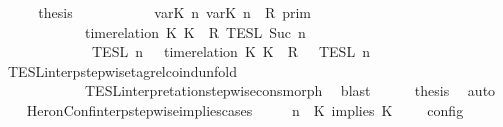 \begin{isabellebody}
\ \ \isamarkupfalse%
\ \isamarkupfalse%
\ {\isacharquery}thesis\isanewline
\ \ \isamarkupfalse%
\ {\isacharminus}\isanewline
\ \ \ \ \isamarkupfalse%
\ {\isacartoucheopen}{\isasymlbrakk}\ {\isasymlfloor}{\isasymtau}\isactrlsub v\isactrlsub a\isactrlsub r{\isacharparenleft}K\ n{\isacharparenright}{\isacharcomma}\ {\isasymtau}\isactrlsub v\isactrlsub a\isactrlsub r{\isacharparenleft}K\ n{\isacharparenright}{\isasymrfloor}\ {\isasymin}\ R\ {\isasymrbrakk}\isactrlsub p\isactrlsub r\isactrlsub i\isactrlsub m\isanewline
\ \ \ \ \ \ \ \ \ \ {\isasyminter}\ {\isasymlbrakk}\ time{\isacharminus}relation\ {\isasymlfloor}K\ K\ {\isasymin}\ R\ {\isasymrbrakk}\isactrlsub T\isactrlsub E\isactrlsub S\isactrlsub L\isactrlbsup {\isasymge}\ Suc\ n\isactrlesup \isanewline
\ \ \ \ \ \ \ \ \ \ {\isasyminter}\ {\isasymlbrakk}{\isasymlbrakk}\ {\isasymPsi}\ {\isasymrbrakk}{\isasymrbrakk}\isactrlsub T\isactrlsub E\isactrlsub S\isactrlsub L\isactrlbsup {\isasymge}\ n\isactrlesup \ {\isacharequal}\ {\isasymlbrakk}{\isasymlbrakk}\ {\isacharparenleft}time{\isacharminus}relation\ {\isasymlfloor}K\ K\ {\isasymin}\ R{\isacharparenright}\ {\isacharhash}\ {\isasymPsi}\ {\isasymrbrakk}{\isasymrbrakk}\isactrlsub T\isactrlsub E\isactrlsub S\isactrlsub L\isactrlbsup {\isasymge}\ n\isactrlesup {\isacartoucheclose}\isanewline
\ \ \ \ \ \ \isamarkupfalse%
\ TESL{\isacharunderscore}interp{\isacharunderscore}stepwise{\isacharunderscore}tagrel{\isacharunderscore}coind{\isacharunderscore}unfold\isanewline
\ \ \ \ \ \ \ \ \ \ \ \ TESL{\isacharunderscore}interpretation{\isacharunderscore}stepwise{\isacharunderscore}cons{\isacharunderscore}morph\ \isamarkupfalse%
\ blast\isanewline
\ \ \ \ \isamarkupfalse%
\ {\isacharquery}thesis\ \isamarkupfalse%
\ auto\isanewline
\ \ \isamarkupfalse%
\isanewline
{}\isamarkupfalse%
%
\endisatagproof
{\isafoldproof}%
%
\isadelimproof
\isanewline
%
\endisadelimproof
\isanewline
{}\isamarkupfalse%
\ HeronConf{\isacharunderscore}interp{\isacharunderscore}stepwise{\isacharunderscore}implies{\isacharunderscore}cases{\isacharcolon}\isanewline
\ \ \ {\isacartoucheopen}{\isasymlbrakk}\ {\isasymGamma}{\isacharcomma}\ n\ {\isasymturnstile}\ {\isacharparenleft}{\isacharparenleft}K\ implies\ K\ {\isacharhash}\ {\isasymPsi}{\isacharparenright}\ {\isasymtriangleright}\ {\isasymPhi}\ {\isasymrbrakk}\isactrlsub c\isactrlsub o\isactrlsub n\isactrlsub f\isactrlsub i\isactrlsub g\isanewline

\end{isabellebody}
